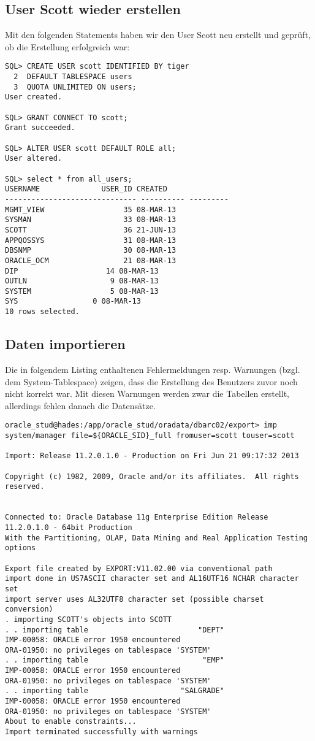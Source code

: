 \documentclass[11pt,a4paper,parskip=half]{scrartcl}
\begin{document}
\subsection{User Scott wieder erstellen}
Mit den folgenden Statements haben wir den User Scott neu erstellt und geprüft, ob die Erstellung erfolgreich war:
\begin{lstlisting}
SQL> CREATE USER scott IDENTIFIED BY tiger
  2  DEFAULT TABLESPACE users
  3  QUOTA UNLIMITED ON users;
User created.

SQL> GRANT CONNECT TO scott;
Grant succeeded.

SQL> ALTER USER scott DEFAULT ROLE all;
User altered.

SQL> select * from all_users;
USERNAME			  USER_ID CREATED
------------------------------ ---------- ---------
MGMT_VIEW			       35 08-MAR-13
SYSMAN				       33 08-MAR-13
SCOTT				       36 21-JUN-13
APPQOSSYS			       31 08-MAR-13
DBSNMP				       30 08-MAR-13
ORACLE_OCM			       21 08-MAR-13
DIP				       14 08-MAR-13
OUTLN					9 08-MAR-13
SYSTEM					5 08-MAR-13
SYS					0 08-MAR-13
10 rows selected.
\end{lstlisting}

\subsection{Daten importieren}
Die in folgendem Listing enthaltenen Fehlermeldungen resp. Warnungen (bzgl. dem System-Tablespace) zeigen, dass die Erstellung des Benutzers zuvor noch nicht korrekt war. Mit diesen Warnungen werden zwar die Tabellen erstellt, allerdings fehlen danach die Datensätze.

\begin{lstlisting}
oracle_stud@hades:/app/oracle_stud/oradata/dbarc02/export> imp system/manager file=${ORACLE_SID}_full fromuser=scott touser=scott

Import: Release 11.2.0.1.0 - Production on Fri Jun 21 09:17:32 2013

Copyright (c) 1982, 2009, Oracle and/or its affiliates.  All rights reserved.


Connected to: Oracle Database 11g Enterprise Edition Release 11.2.0.1.0 - 64bit Production
With the Partitioning, OLAP, Data Mining and Real Application Testing options

Export file created by EXPORT:V11.02.00 via conventional path
import done in US7ASCII character set and AL16UTF16 NCHAR character set
import server uses AL32UTF8 character set (possible charset conversion)
. importing SCOTT's objects into SCOTT
. . importing table                         "DEPT"
IMP-00058: ORACLE error 1950 encountered
ORA-01950: no privileges on tablespace 'SYSTEM'
. . importing table                          "EMP"
IMP-00058: ORACLE error 1950 encountered
ORA-01950: no privileges on tablespace 'SYSTEM'
. . importing table                     "SALGRADE"
IMP-00058: ORACLE error 1950 encountered
ORA-01950: no privileges on tablespace 'SYSTEM'
About to enable constraints...
Import terminated successfully with warnings
\end{lstlisting}
\end{document}
